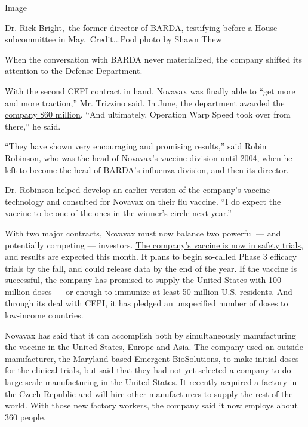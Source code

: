 Image

Dr. Rick Bright,~the former director of BARDA, testifying before a House
subcommittee in May.~Credit...Pool photo by Shawn Thew

When the conversation with BARDA never materialized, the company shifted
its attention to the Defense Department.

With the second CEPI contract in hand, Novavax was finally able to ``get
more and more traction,'' Mr. Trizzino said. In June, the department
\href{https://ir.novavax.com/news-releases/news-release-details/novavax-awarded-department-defense-contract-covid-19-vaccine}{awarded
the company \$60 million}. ``And ultimately, Operation Warp Speed took
over from there,'' he said.

``They have shown very encouraging and promising results,'' said Robin
Robinson, who was the head of Novavax's vaccine division until 2004,
when he left to become the head of BARDA's influenza division, and then
its director.

Dr. Robinson helped develop an earlier version of the company's vaccine
technology and consulted for Novavax on their flu vaccine. ``I do expect
the vaccine to be one of the ones in the winner's circle next year.''

With two major contracts, Novavax must now balance two powerful --- and
potentially competing --- investors.
\href{https://www.nytimes.com/interactive/2020/science/coronavirus-vaccine-tracker.html}{The
company's vaccine is now in safety trials}, and results are expected
this month. It plans to begin so-called Phase 3 efficacy trials by the
fall, and could release data by the end of the year. If the vaccine is
successful, the company has promised to supply the United States with
100 million doses --- or enough to immunize at least 50 million U.S.
residents. And through its deal with CEPI, it has pledged an unspecified
number of doses to low-income countries.

Novavax has said that it can accomplish both by simultaneously
manufacturing the vaccine in the United States, Europe and Asia. The
company used an outside manufacturer, the Maryland-based Emergent
BioSolutions, to make initial doses for the clinical trials, but said
that they had not yet selected a company to do large-scale manufacturing
in the United States. It recently acquired a factory in the Czech
Republic and will hire other manufacturers to supply the rest of the
world. With those new factory workers, the company said it now employs
about 360 people.

